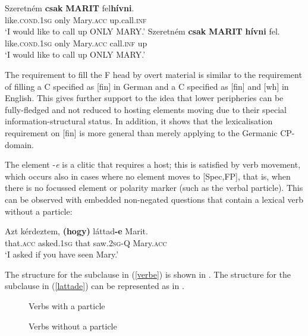\ea
\ea \gll Szeretném \textbf{csak} \textbf{MARIT} fel\textbf{hívni}.\\
like.\textsc{cond.1sg} only Mary.\textsc{acc} up.call.\textsc{inf}\\
\glt `I would like to call up ONLY MARY.'
\ex \gll Szeretném \textbf{csak} \textbf{MARIT} \textbf{hívni} fel.\\
like.\textsc{cond.1sg} only Mary.\textsc{acc} call.\textsc{inf} up\\
\glt `I would like to call up ONLY MARY.'
\z
\z

The requirement to fill the F head by overt material is similar to the requirement of filling a C specified as [fin] in German and a C specified as [fin] and [wh] in English. This gives further support to the idea that lower peripheries can be fully-fledged and not reduced to hosting elements moving due to their special information-structural status. In addition, it shows that the lexicalisation requirement on [fin] is more general than merely applying to the Germanic CP-domain.

The element -\textit{e} is a  clitic that requires a host; this is satisfied by verb movement, which occurs also in cases where no element moves to [Spec,FP], that is, when there is no focussed element or polarity marker (such as the verbal particle). This can be observed with embedded non-negated questions that contain a lexical verb without a particle:

\ea \gll Azt kérdeztem, \textbf{(hogy)} l\'attad\textbf{-e} Marit. \label{lattade}\\
that.\textsc{acc} asked.\textsc{1sg} \phantom{\textbf{(}}that saw.\textsc{2sg}-Q Mary.\textsc{acc}\\
\glt `I asked if you have seen Mary.'
\z

The structure for the subclause in (\ref{verbe}) is shown in . The structure for the subclause in (\ref{lattade}) can be represented as in .


\begin{figure}
\begin{floatrow}
\captionsetup{margin=.05\linewidth}
{\caption{Verbs with a particle} \label{treeverbe}}

{\caption{Verbs without a particle} \label{fig:6:ex27}}
\end{floatrow}
\end{figure}


